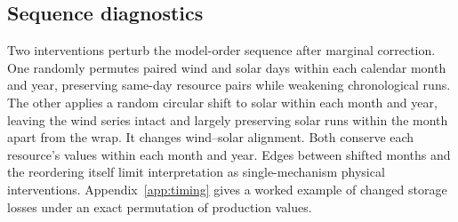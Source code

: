 \subsection{Sequence diagnostics}
Two interventions perturb the model-order sequence after marginal correction. One randomly permutes paired wind and solar days within each calendar month and year, preserving same-day resource pairs while weakening chronological runs. The other applies a random circular shift to solar within each month and year, leaving the wind series intact and largely preserving solar runs within the month apart from the wrap. It changes wind--solar alignment. Both conserve each resource's values within each month and year. Edges between shifted months and the reordering itself limit interpretation as single-mechanism physical interventions. Appendix~\ref{app:timing} gives a worked example of changed storage losses under an exact permutation of production values.
